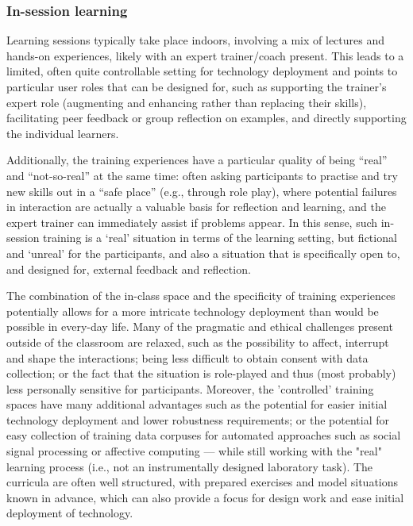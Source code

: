 \documentclass[prodmode,acmtochi]{acmsmall}
\newcommand{\GeraldineFIX}[1]{}
\begin{document}
\subsubsection{In-session learning}
Learning sessions typically take place indoors, involving a mix of lectures and hands-on experiences, likely with an expert trainer/coach present. This leads to a limited, often quite controllable setting for technology deployment and points to particular user roles that can be designed for, such as supporting the trainer's expert role (augmenting and enhancing rather than replacing their skills), facilitating peer feedback or group reflection on examples, and directly supporting the individual learners.

Additionally,  the training experiences have a particular quality of being ``real'' and ``not-so-real'' at the same time: often asking participants to practise and try new skills out in a ``safe place'' (e.g., through role play), where potential failures in interaction are actually a valuable basis for reflection and learning, and the expert trainer can immediately assist if problems appear. In this sense, such in-session training is a `real' situation in terms of the learning setting, but fictional and `unreal' for the participants, and also a situation that is specifically open to, and designed for, external feedback and reflection. 

The combination of the in-class space and the specificity of training experiences potentially allows for a more intricate\GeraldineFIX{G: not sure 'pervasive' is the right word here - what do you mean here?\ is it that it can be rolled out to lots of training contexts, or that it gets dedicated/focussed use or? } technology deployment than would be possible in every-day life. Many of the pragmatic and ethical challenges present outside of the classroom are relaxed, such as the possibility to affect, interrupt and shape the interactions; being less difficult to obtain consent with data collection; %
or the fact that the situation is role-played and thus (most probably) less personally sensitive for participants. Moreover, the 'controlled' training spaces have many additional advantages such as the potential for easier initial technology deployment and lower robustness requirements; or the potential for easy collection of training data corpuses for automated approaches such as social signal processing \GeraldineFIX{G: SSP - don't think this has been set up as an abbreviation before this? assume it is social sig  process?}or affective computing --- while still working with the "real" learning process (i.e., not an instrumentally designed laboratory task). The curricula are often well structured, with prepared exercises and model situations known in advance, which can also provide a focus for design work and ease initial deployment of technology. 
\end{document}

